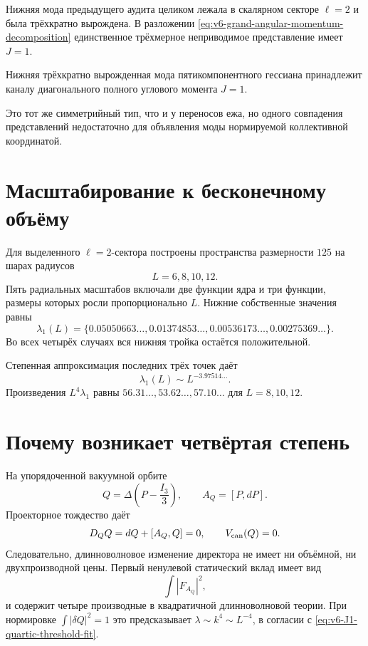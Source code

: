 Нижняя мода предыдущего аудита целиком лежала в скалярном секторе
$\ell=2$ и была трёхкратно вырождена. В разложении
\eqref{eq:v6-grand-angular-momentum-decomposition} единственное
трёхмерное неприводимое представление имеет $J=1$.

\begin{proposition}
Нижняя трёхкратно вырожденная мода пятикомпонентного гессиана принадлежит
каналу диагонального полного углового момента $J=1$.
\end{proposition}

Это тот же симметрийный тип, что и у переносов ежа, но одного совпадения
представлений недостаточно для объявления моды нормируемой коллективной
координатой.

\section{Масштабирование к бесконечному объёму}

Для выделенного $\ell=2$-сектора построены пространства размерности $125$
на шарах радиусов
\begin{equation}
 L=6,8,10,12.
\end{equation}
Пять радиальных масштабов включали две функции ядра и три функции, размеры
которых росли пропорционально $L$. Нижние собственные значения равны
\begin{equation}
 \lambda_1(L)=
 \{0.05050663\ldots,
 0.01374853\ldots,
 0.00536173\ldots,
 0.00275369\ldots\}.
 \label{eq:v6-J1-finite-volume-sequence}
\end{equation}
Во всех четырёх случаях вся нижняя тройка остаётся положительной.

Степенная аппроксимация последних трёх точек даёт
\begin{equation}
 \lambda_1(L)\sim L^{-3.97514\ldots}.
 \label{eq:v6-J1-quartic-threshold-fit}
\end{equation}
Произведения $L^4\lambda_1$ равны
$56.31\ldots,53.62\ldots,57.10\ldots$ для $L=8,10,12$.

\section{Почему возникает четвёртая степень}

На упорядоченной вакуумной орбите
\begin{equation}
 Q=\Delta\left(P-\frac{I_3}{3}\right),
 \qquad A_Q=[P,dP].
\end{equation}
Проекторное тождество даёт
\begin{equation}
 D_QQ=dQ+[A_Q,Q]=0,
 \qquad V_{\rm can}(Q)=0.
 \label{eq:v6-vacuum-orbit-two-derivative-cancellation}
\end{equation}
Следовательно, длинноволновое изменение директора не имеет ни объёмной,
ни двухпроизводной цены. Первый ненулевой статический вклад имеет вид
\begin{equation}
 \int|F_{A_Q}|^2,
\end{equation}
и содержит четыре производные в квадратичной длинноволновой теории.
При нормировке $\int|\delta Q|^2=1$ это предсказывает
$\lambda\sim k^4\sim L^{-4}$, в согласии с
\eqref{eq:v6-J1-quartic-threshold-fit}.

